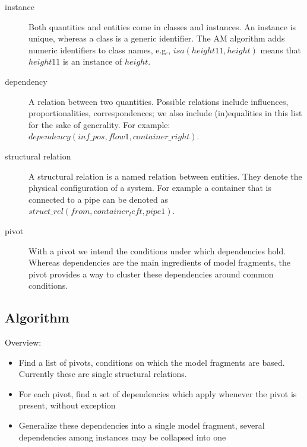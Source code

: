 \documentclass{article} %
\begin{document}
\begin{description}

\item[instance] Both quantities and entities come in classes and instances.
	An instance is unique, whereas a class is a generic identifier.
	The AM algorithm adds numeric identifiers to class names, e.g.,
	$isa(height11, height)$ means that $height11$ is an instance of
	$height$.


\item[dependency] A relation between two quantities. Possible relations
	include influences, proportionalities, correspondences; we also
	include (in)equalities in this list for the sake of generality.
	For example: $dependency(inf\_pos, flow1, container\_right)$.

\item[structural relation]
	A structural relation is a named relation between entities. They denote
	the physical configuration of a system. For example a container that is
	connected to a pipe can be denoted as $struct\_rel(from, container_left,
	pipe1)$.

\item[pivot]
	With a pivot we intend the conditions under which dependencies hold.
	Whereas dependencies are the main ingredients of model fragments,
	the pivot provides a way to cluster these dependencies around common
	conditions.

\end{description}

\subsection{Algorithm}
\label{sec:algorithm}

Overview:

\begin{itemize}

\item Find a list of pivots, conditions on which the model fragments are
	based. Currently these are single structural relations.

\item For each pivot, find a set of dependencies which apply whenever the
	pivot is present, without exception

\item Generalize these dependencies into a single model fragment, several
	dependencies among instances may be collapsed into one

\end{itemize}
\end{document}
